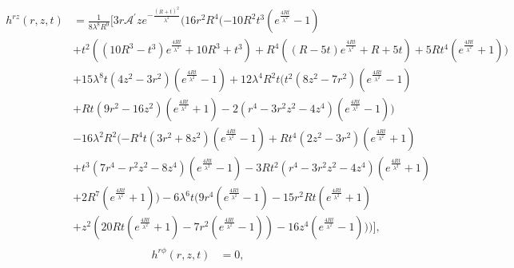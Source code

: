 \begin{align}
\begin{split}
        h^{rz}(r,z,t) &=
\frac{1}{8 \lambda ^8 R^9}\bigg[3 r \mathcal{A}^\prime z e^{-\frac{(R+t)^2}{\lambda ^2}} (16 r^2 R^4 (-10 R^2 t^3 (e^{\frac{4 R t}{\lambda ^2}}-1) \\
&+t^2 ((10 R^3-t^3) e^{\frac{4 R t}{\lambda ^2}}+10 R^3+t^3)+R^4 ((R-5 t) e^{\frac{4 R t}{\lambda ^2}}+R+5 t)+5 R t^4 (e^{\frac{4 R t}{\lambda ^2}}+1)) \\
&+15 \lambda ^8 t (4 z^2-3 r^2) (e^{\frac{4 R t}{\lambda ^2}}-1)+12 \lambda ^4 R^2 t (t^2 (8 z^2-7 r^2) (e^{\frac{4 R t}{\lambda ^2}}-1) \\
&+R t (9 r^2-16 z^2) (e^{\frac{4 R t}{\lambda ^2}}+1)-2 (r^4-3 r^2 z^2-4 z^4) (e^{\frac{4 R t}{\lambda ^2}}-1)) \\
&-16 \lambda ^2 R^2 (-R^4 t (3 r^2+8 z^2) (e^{\frac{4 R t}{\lambda ^2}}-1)+R t^4 (2 z^2-3 r^2) (e^{\frac{4 R t}{\lambda ^2}}+1) \\
&+t^3 (7 r^4-r^2 z^2-8 z^4) (e^{\frac{4 R t}{\lambda ^2}}-1)-3 R t^2 (r^4-3 r^2 z^2-4 z^4) (e^{\frac{4 R t}{\lambda ^2}}+1) \\
&+2 R^7 (e^{\frac{4 R t}{\lambda ^2}}+1))-6 \lambda ^6 t (9 r^4 (e^{\frac{4 R t}{\lambda ^2}}-1)-15 r^2 R t (e^{\frac{4 R t}{\lambda ^2}}+1) \\
&+z^2 (20 R t (e^{\frac{4 R t}{\lambda ^2}}+1)-7 r^2 (e^{\frac{4 R t}{\lambda ^2}}-1))-16 z^4 (e^{\frac{4 R t}{\lambda ^2}}-1)))\bigg],
\end{split}
\end{align}
\begin{align}
        h^{r\phi}(r,z,t) &= 0,
\end{align}
